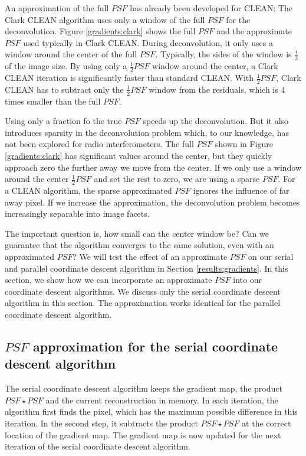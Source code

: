 An approximation of the full $PSF$ has already been developed for CLEAN: The Clark CLEAN algorithm \cite{clark1980efficient} uses only a window of the full $PSF$ for the deconvolution. Figure \ref{gradients:clark} shows the full $PSF$ and the approximate $PSF$ used typically in Clark CLEAN. During deconvolution, it only uses a window around the center of the full $PSF$. Typically, the sides of the window is $\frac{1}{2}$ of the image size. By using only a $\frac{1}{2} PSF$ window around the center, a Clark CLEAN iteration is significantly faster than standard CLEAN. With $\frac{1}{2} PSF$, Clark CLEAN has to subtract only the $\frac{1}{2} PSF$ window from the residuals, which is 4 times smaller than the full $PSF$.

Using only a fraction fo the true $PSF$ speeds up the deconvolution. But it also introduces sparsity in the deconvolution problem which, to our knowledge, has not been explored for radio interferometers. The full $PSF$ shown in Figure \ref{gradients:clark} has significant values around the center, but they quickly approach zero the further away we move from the center. If we only use a window around the center $\frac{1}{2} PSF$ and set the rest to zero, we are using a sparse $PSF$. For a CLEAN algorithm, the sparse approximated $PSF$ ignores the influence of far away pixel. If we increase the approximation, the deconvolution problem becomes increasingly separable into image facets.

The important question is, how small can the center window be? Can we guarantee that the algorithm converges to the same solution, even with an approximated $PSF$? We will test the effect of an approximate $PSF$ on our serial and parallel coordinate descent algorithm in Section \ref{results:gradients}. In this section, we show how we can incorporate an approximate $PSF$ into our coordinate descent algorithms. We discuss only the serial coordinate descent algorithm in this section. The approximation works identical for the parallel coordinate descent algorithm.


\subsection{$PSF$ approximation for the serial coordinate descent algorithm}
The serial coordinate descent algorithm keeps the gradient map, the product $PSF \star PSF$ and the current reconstruction in memory. In each iteration, the algorithm first finds the pixel, which has the maximum possible difference in this iteration. In the second step, it subtracts the product $PSF \star PSF$ at the correct location of the gradient map. The gradient map is now updated for the next iteration of the serial coordinate descent algorithm.

